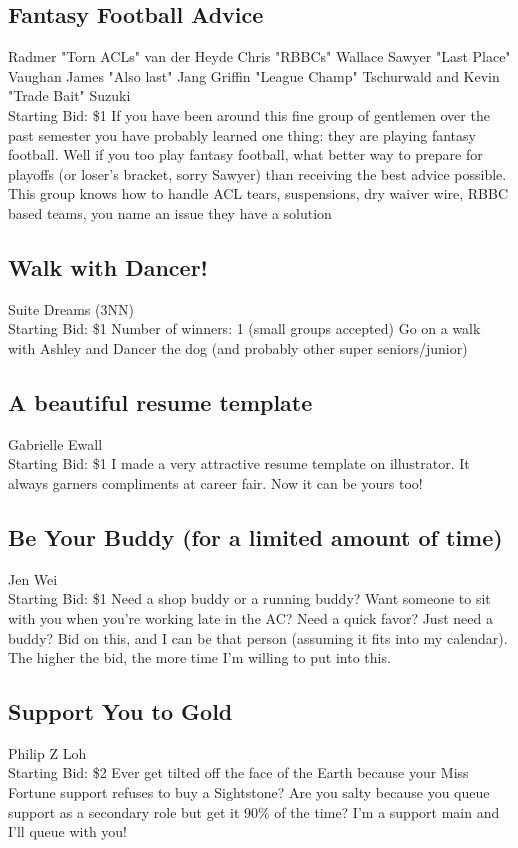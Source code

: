 \documentclass[11pt]{article}
\begin{document}
\subsection{Fantasy Football Advice}
Radmer "Torn ACLs" van der Heyde Chris "RBBCs" Wallace Sawyer "Last Place" Vaughan James "Also last" Jang Griffin "League Champ" Tschurwald and Kevin "Trade Bait" Suzuki
\\
Starting Bid: \$1
\newline
If you have been around this fine group of gentlemen over the past semester you have probably learned one thing: they are playing fantasy football. Well if you too play fantasy football, what better way to prepare for playoffs (or loser's bracket, sorry Sawyer) than receiving the best advice possible. This group knows how to handle ACL tears, suspensions, dry waiver wire, RBBC based teams, you name an issue they have a solution
\subsection{Walk with Dancer!}
Suite Dreams (3NN)
\\
Starting Bid: \$1
\newline
Number of winners: 1 (small groups accepted)
\newline
Go on a walk with Ashley and Dancer the dog (and probably other super seniors/junior)
\subsection{A beautiful resume template }
Gabrielle Ewall
\\
Starting Bid: \$1
\newline
I made a very attractive resume template on illustrator. It always garners compliments at career fair. Now it can be yours too!
\subsection{Be Your Buddy (for a limited amount of time)}
Jen Wei
\\
Starting Bid: \$1
\newline
Need a shop buddy or a running buddy? Want someone to sit with you when you're working late in the AC? Need a quick favor? Just need a buddy? Bid on this, and I can be that person (assuming it fits into my calendar). The higher the bid, the more time I'm willing to put into this.
\subsection{Support You to Gold}
Philip Z Loh
\\
Starting Bid: \$2
\newline
Ever get tilted off the face of the Earth because your Miss Fortune support refuses to buy a Sightstone? Are you salty because you queue support as a secondary role but get it 90\% of the time? I'm a support main and I'll queue with you!
\end{document}
